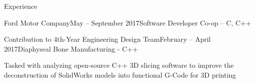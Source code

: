 \documentclass{resume} %
\begin{document}
\begin{rSection}{Experience}
\begin{rSubsection}{Ford Motor Company}{May -- September 2017}{Software Developer Co-op -- C, C++}{}
\end{rSubsection}

\begin{rSubsection}{Contribution to 4th-Year Engineering Design Team}{February -- April 2017}{Diaphyseal Bone Manufacturing - C++}{}
\item Tasked with analyzing open-source C++ 3D slicing software to improve the deconstruction of SolidWorks models into functional G-Code for 3D printing
\end{rSubsection}

\end{rSection}


\end{document}
